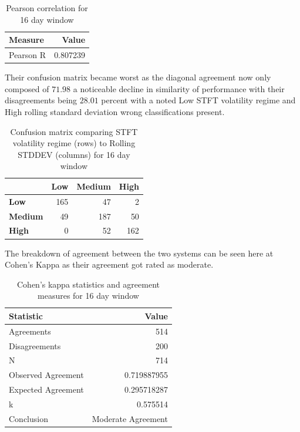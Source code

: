 \documentclass[12pt,letterpaper]{article}
\begin{document}
		\begin{table}[htbp]
			\centering
			\caption{Pearson correlation for 16 day window}
			\label{tab:correlation_16day}
			\begin{tabular}{@{}lr@{}}
				\hline
				\textbf{Measure} & \textbf{Value} \\
				\hline
				Pearson R & 0.807239 \\
				\hline
			\end{tabular}
		\end{table}
		
		Their confusion matrix became worst as the diagonal agreement now only composed of $71.98$ a noticeable decline in similarity of performance with their disagreements being $28.01$ percent with a noted Low STFT volatility regime and High rolling standard deviation wrong classifications present.
		
		\begin{table}[htbp]
			\centering
			\caption{Confusion matrix comparing STFT volatility regime (rows) to Rolling STDDEV (columns) for 16 day window}
			\label{tab:confusion_16day}
			\begin{tabular}{@{}l r r r@{}}
				\hline
				& \textbf{Low} & \textbf{Medium} & \textbf{High} \\
				\hline
				\textbf{Low}    & 165 & 47  & 2   \\
				\textbf{Medium} & 49  & 187 & 50  \\
				\textbf{High}   & 0   & 52  & 162 \\
				\hline
			\end{tabular}
		\end{table}
		
		The breakdown of agreement between the two systems can be seen here at Cohen's Kappa as their agreement got rated as moderate.
		
		\begin{table}[htbp]
			\centering
			\caption{Cohen's kappa statistics and agreement measures for 16 day window}
			\label{tab:kappa_16day}
			\begin{tabular}{@{}l r@{}}
				\hline
				\textbf{Statistic} & \textbf{Value} \\
				\hline
				Agreements & 514 \\
				Disagreements & 200 \\
				N & 714 \\
				Observed Agreement & 0.719887955 \\
				Expected Agreement & 0.295718287 \\
				k & 0.575514 \\
				Conclusion & Moderate Agreement \\
				\hline
			\end{tabular}
		\end{table}
		
\end{document}
